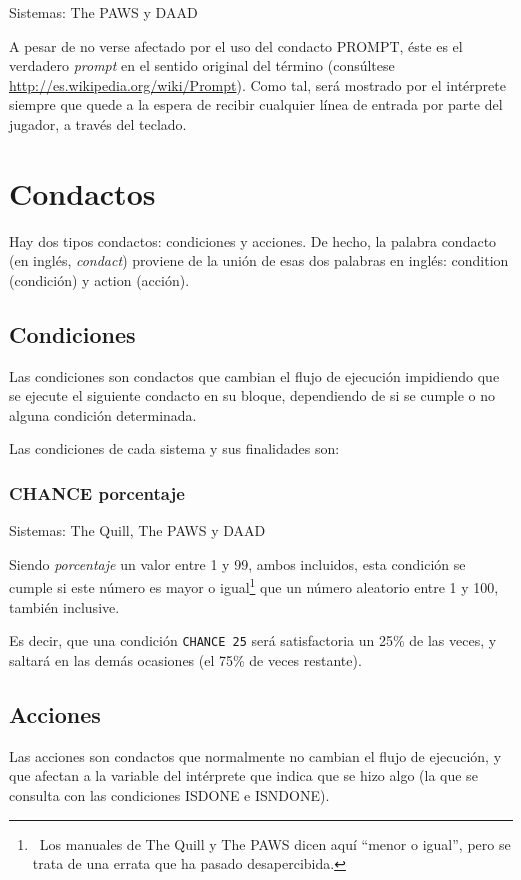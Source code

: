 \documentclass[11pt, a5paper]{article}
\newcommand{\quill}{\textsf{The Quill}\xspace}
\newcommand{\paw}{\textsf{The PAWS}\xspace}
\newcommand{\daad}{\textsf{DAAD}\xspace}
\newcommand{\sistemas}[1]{\noindent Sistemas: #1 \nopagebreak}
\begin{document}
\sistemas{\paw y \daad}

A pesar de no verse afectado por el uso del condacto PROMPT, éste es el verdadero \emph{prompt} en el sentido original del término (consúltese \url{http://es.wikipedia.org/wiki/Prompt}). Como tal, será mostrado por el intérprete siempre que quede a la espera de recibir cualquier línea de entrada por parte del jugador, a través del teclado.


\section{Condactos}

Hay dos tipos condactos: condiciones y acciones. De hecho, la palabra condacto (en inglés, \emph{condact}) proviene de la unión de esas dos palabras en inglés: condition (condición) y action (acción).

\subsection{Condiciones}

Las condiciones son condactos que cambian el flujo de ejecución impidiendo que se ejecute el siguiente condacto en su bloque, dependiendo de si se cumple o no alguna condición determinada.

Las condiciones de cada sistema y sus finalidades son:

\subsubsection{CHANCE porcentaje}

\sistemas{\quill, \paw y \daad}

Siendo \emph{porcentaje} un valor entre 1 y 99, ambos incluidos, esta condición se cumple si este número es mayor o igual\footnote{\ Los manuales de \quill y \paw dicen aquí ``menor o igual'', pero se trata de una errata que ha pasado desapercibida.} que un número aleatorio entre 1 y 100, también inclusive.

Es decir, que una condición \texttt{CHANCE 25} será satisfactoria un 25\% de las veces, y saltará en las demás ocasiones (el 75\% de veces restante).


\subsection{Acciones}

Las acciones son condactos que normalmente no cambian el flujo de ejecución, y que afectan a la variable del intérprete que indica que se hizo algo (la que se consulta con las condiciones ISDONE e ISNDONE).
\end{document}

